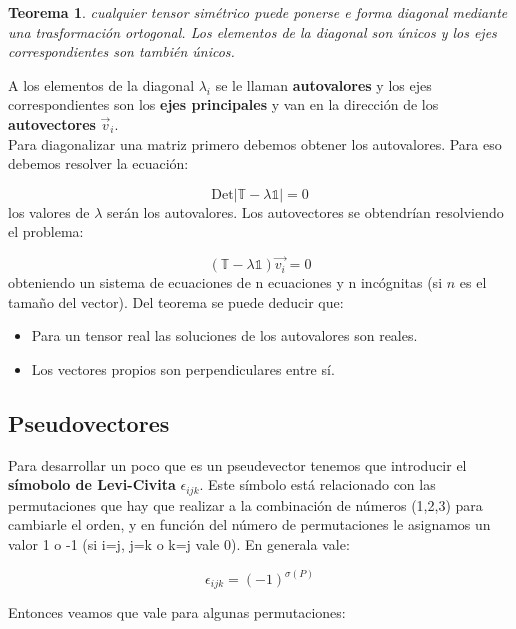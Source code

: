 \documentclass[12pt,a4paper]{book}
\newtheorem{theorem}{Teorema}[section]
\begin{document}
\begin{theorem}
cualquier tensor simétrico puede ponerse e forma diagonal mediante una trasformación ortogonal. Los elementos de la diagonal son únicos y los ejes correspondientes son también únicos. 
\end{theorem}
A los elementos de la diagonal $\lambda_i$ se le llaman \textbf{autovalores} y los ejes correspondientes son los \textbf{ejes principales} y van en la dirección de los \textbf{autovectores} $\vec{v}_i$. \\

Para diagonalizar una matriz primero debemos obtener los autovalores. Para eso debemos resolver la ecuación:

\begin{equation}
\mathrm{Det}|\mathbb{T}-\lambda \mathds{1} | = 0
\end{equation}
los valores de $\lambda$ serán los autovalores. Los autovectores se obtendrían resolviendo el problema:

\begin{equation}
(\mathbb{T}-\lambda \mathds{1}) \vec{v_i} = 0
\end{equation}
obteniendo un sistema de ecuaciones de n ecuaciones y n incógnitas (si $n$ es el tamaño del vector). Del teorema se puede deducir que:

\begin{itemize}
\item Para un tensor real las soluciones de los autovalores son reales.
\item Los vectores propios son perpendiculares entre sí.
\end{itemize}

\subsection{Pseudovectores}

Para desarrollar un poco que es un pseudevector tenemos que introducir el \textbf{símobolo de Levi-Civita} $\epsilon_{ijk}$. Este símbolo está relacionado con las permutaciones que hay que realizar a la combinación de números (1,2,3) para cambiarle el orden, y en función del número de permutaciones le asignamos un valor 1 o -1 (si i=j, j=k o k=j vale 0). En generala vale:

$$\epsilon_{ijk} = (-1)^{\sigma(P)}$$

Entonces veamos que vale para algunas permutaciones:
\end{document}
